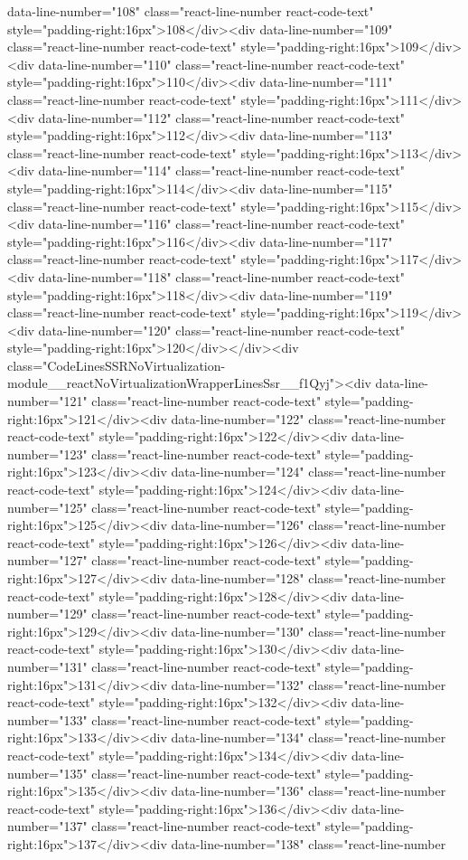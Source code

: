 {{{{{{{data-line-number="108" class="react-line-number react-code-text" style="padding-right:16px">108</div><div data-line-number="109" class="react-line-number react-code-text" style="padding-right:16px">109</div><div data-line-number="110" class="react-line-number react-code-text" style="padding-right:16px">110</div><div data-line-number="111" class="react-line-number react-code-text" style="padding-right:16px">111</div><div data-line-number="112" class="react-line-number react-code-text" style="padding-right:16px">112</div><div data-line-number="113" class="react-line-number react-code-text" style="padding-right:16px">113</div><div data-line-number="114" class="react-line-number react-code-text" style="padding-right:16px">114</div><div data-line-number="115" class="react-line-number react-code-text" style="padding-right:16px">115</div><div data-line-number="116" class="react-line-number react-code-text" style="padding-right:16px">116</div><div data-line-number="117" class="react-line-number react-code-text" style="padding-right:16px">117</div><div data-line-number="118" class="react-line-number react-code-text" style="padding-right:16px">118</div><div data-line-number="119" class="react-line-number react-code-text" style="padding-right:16px">119</div><div data-line-number="120" class="react-line-number react-code-text" style="padding-right:16px">120</div></div><div class="CodeLinesSSRNoVirtualization-module__reactNoVirtualizationWrapperLinesSsr__f1Qyj"><div data-line-number="121" class="react-line-number react-code-text" style="padding-right:16px">121</div><div data-line-number="122" class="react-line-number react-code-text" style="padding-right:16px">122</div><div data-line-number="123" class="react-line-number react-code-text" style="padding-right:16px">123</div><div data-line-number="124" class="react-line-number react-code-text" style="padding-right:16px">124</div><div data-line-number="125" class="react-line-number react-code-text" style="padding-right:16px">125</div><div data-line-number="126" class="react-line-number react-code-text" style="padding-right:16px">126</div><div data-line-number="127" class="react-line-number react-code-text" style="padding-right:16px">127</div><div data-line-number="128" class="react-line-number react-code-text" style="padding-right:16px">128</div><div data-line-number="129" class="react-line-number react-code-text" style="padding-right:16px">129</div><div data-line-number="130" class="react-line-number react-code-text" style="padding-right:16px">130</div><div data-line-number="131" class="react-line-number react-code-text" style="padding-right:16px">131</div><div data-line-number="132" class="react-line-number react-code-text" style="padding-right:16px">132</div><div data-line-number="133" class="react-line-number react-code-text" style="padding-right:16px">133</div><div data-line-number="134" class="react-line-number react-code-text" style="padding-right:16px">134</div><div data-line-number="135" class="react-line-number react-code-text" style="padding-right:16px">135</div><div data-line-number="136" class="react-line-number react-code-text" style="padding-right:16px">136</div><div data-line-number="137" class="react-line-number react-code-text" style="padding-right:16px">137</div><div data-line-number="138" class="react-line-number }}}}}}}
